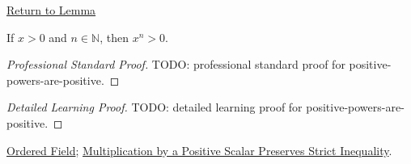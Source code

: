 \newpage
{}
\label{prf:positive-powers-are-positive}

\begin{remark*}[Return]
\hyperref[lem:positive-powers-are-positive]{Return to Lemma}
\end{remark*}

\begin{lemma*}
If $x>0$ and $n\in\mathbb{N}$, then $x^n>0$.
\end{lemma*}

\begin{proof}[Professional Standard Proof]
\LRAProofBodyStart
TODO: professional standard proof for positive-powers-are-positive.
\end{proof}

\begin{proof}[Detailed Learning Proof]
\LRAProofBodyStart
TODO: detailed learning proof for positive-powers-are-positive.
\end{proof}

\begin{remark*}
\end{remark*}

\begin{dependencies}
\hyperref[def:real-ordered-field]{Ordered Field};
\hyperref[thm:ineq-multiply-positive]{Multiplication by a Positive Scalar Preserves Strict Inequality}.
\end{dependencies}

\clearpage
